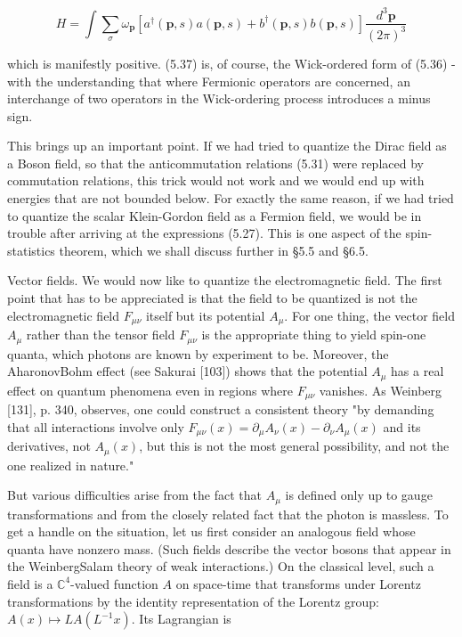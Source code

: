 \documentclass[10pt, letterpaper]{article}
\begin{document}
$$
H=\int \sum_{\sigma} \omega_{\mathbf{p}}\left[a^{\dagger}(\mathbf{p}, s) a(\mathbf{p}, s)+b^{\dagger}(\mathbf{p}, s) b(\mathbf{p}, s)\right] \frac{d^{3} \mathbf{p}}{(2 \pi)^{3}}
$$

which is manifestly positive. (5.37) is, of course, the Wick-ordered form of (5.36) - with the understanding that where Fermionic operators are concerned, an interchange of two operators in the Wick-ordering process introduces a minus sign.

This brings up an important point. If we had tried to quantize the Dirac field as a Boson field, so that the anticommutation relations (5.31) were replaced by commutation relations, this trick would not work and we would end up with energies that are not bounded below. For exactly the same reason, if we had tried to quantize the scalar Klein-Gordon field as a Fermion field, we would be in trouble after arriving at the expressions (5.27). This is one aspect of the spin-statistics theorem, which we shall discuss further in §5.5 and §6.5.

Vector fields. We would now like to quantize the electromagnetic field. The first point that has to be appreciated is that the field to be quantized is not the electromagnetic field $F_{\mu \nu}$ itself but its potential $A_{\mu}$. For one thing, the vector field $A_{\mu}$ rather than the tensor field $F_{\mu \nu}$ is the appropriate thing to yield spin-one quanta, which photons are known by experiment to be. Moreover, the AharonovBohm effect (see Sakurai [103]) shows that the potential $A_{\mu}$ has a real effect on quantum phenomena even in regions where $F_{\mu \nu}$ vanishes. As Weinberg [131], p. 340, observes, one could construct a consistent theory "by demanding that all interactions involve only $F_{\mu \nu}(x)=\partial_{\mu} A_{\nu}(x)-\partial_{\nu} A_{\mu}(x)$ and its derivatives, not $A_{\mu}(x)$, but this is not the most general possibility, and not the one realized in nature."

But various difficulties arise from the fact that $A_{\mu}$ is defined only up to gauge transformations and from the closely related fact that the photon is massless. To get a handle on the situation, let us first consider an analogous field whose quanta have nonzero mass. (Such fields describe the vector bosons that appear in the WeinbergSalam theory of weak interactions.) On the classical level, such a field is a $\mathbb{C}^{4}$-valued function $A$ on space-time that transforms under Lorentz transformations by the identity representation of the Lorentz group: $A(x) \mapsto L A\left(L^{-1} x\right)$. Its Lagrangian is
\end{document}
